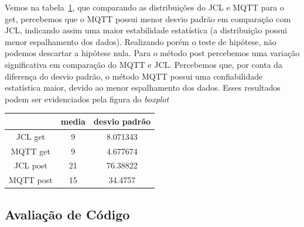 \documentclass[12pt]{article}
\begin{document}
Vemos na tabela~\ref{statics}, que comparando as distribuições do JCL e MQTT para o get, percebemos que o MQTT possui menor desvio padrão em comparação com JCL, indicando assim uma maior estabilidade estatística (a distribuição possui menor espalhamento dos dados). Realizando porém o teste de hipótese, não podemos descartar a hipótese nula. 
%
Para o método post percebemos uma variação significativa em comparação do MQTT e JCL. Percebemos que, por conta da diferença do desvio padrão, o método MQTT possui uma confiabilidade estatística maior, devido ao menor espalhamento dos dados. Esses resultados podem ser evidenciados pela figura do \textit{boxplot} 

\begin{table}[]
\begin{tabular}{@{}ccc@{}}
\label{statics}
\toprule
          & media & desvio padrão \\ \midrule
JCL get   & 9     & 8.071343      \\
MQTT get  & 9     & 4.677674      \\
JCL post  & 21    & 76.38822      \\
MQTT post & 15    & 34.4757       \\ \bottomrule
\end{tabular}
\end{table}


\subsection{Avaliação de Código}
\end{document}
